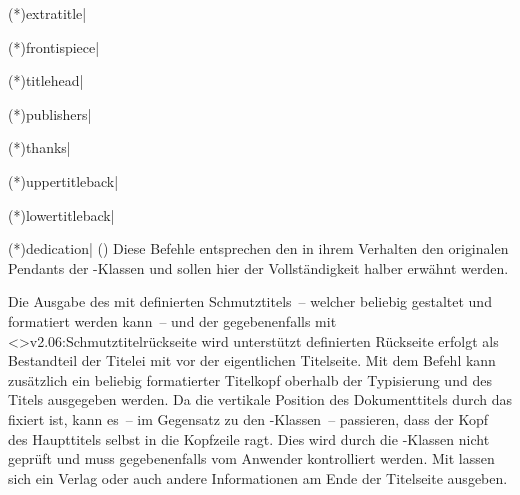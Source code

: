 \begin{DeclareEntity*}{}
\begin{DeclareEntity*}{}
\begin{DeclareEntity*}{}
\begin{Declaration}
  {\Macro(*){extratitle|}}
\begin{Declaration}
  {\Macro(*){frontispiece|}}
\begin{Declaration}
  {\Macro(*){titlehead|}}
\begin{Declaration}
  {\Macro(*){publishers|}}
\begin{Declaration}
  {\Macro(*){thanks|}}
\begin{Declaration}
  {\Macro(*){uppertitleback|}}
\begin{Declaration}
  {\Macro(*){lowertitleback|}}
\begin{Declaration}
  {\Macro(*){dedication|}}
\printdeclarationlist(\seeplain{\scrguide})
%
Diese Befehle entsprechen den in ihrem Verhalten den originalen Pendants der 
\KOMAScript-Klassen und sollen hier der Vollständigkeit halber erwähnt werden.

Die Ausgabe des mit  definierten Schmutztitels~-- welcher 
beliebig gestaltet und formatiert werden kann~-- und der gegebenenfalls mit 
\ChangedAt<>{v2.06:Schmutztitelrückseite wird unterstützt}%
 definierten Rückseite erfolgt als Bestandteil der Titelei 
mit  vor der eigentlichen Titelseite. Mit dem Befehl 
 kann zusätzlich ein beliebig formatierter Titelkopf oberhalb 
der Typisierung und des Titels ausgegeben werden. Da die vertikale Position des 
Dokumenttitels durch das \CD fixiert ist, kann es~-- im Gegensatz zu den 
\KOMAScript-Klassen~-- passieren, dass der Kopf des Haupttitels selbst in die 
Kopfzeile ragt. Dies wird durch die \TUDScript-Klassen nicht geprüft und muss 
gegebenenfalls vom Anwender kontrolliert werden. Mit  lassen 
sich ein Verlag oder auch andere Informationen am Ende der Titelseite ausgeben.


\end{Declaration}
\end{Declaration}
\end{Declaration}
\end{Declaration}
\end{Declaration}
\end{Declaration}
\end{Declaration}
\end{Declaration}
\end{DeclareEntity*}
\end{DeclareEntity*}
\end{DeclareEntity*}
